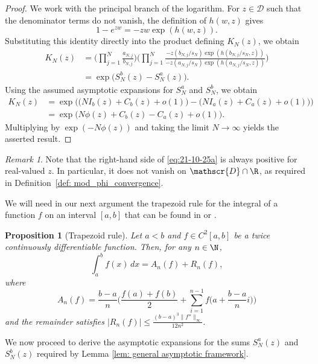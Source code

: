 \documentclass[11pt,a4paper]{scrartcl}
\numberwithin{equation}{section}
\theoremstyle{plain}
\newtheorem{proposition}{Proposition}[section]
\theoremstyle{definition}
\theoremstyle{remark}
\newtheorem{remark}{Remark}[section]
\begin{document}
\begin{proof}
We work with the principal branch of the logarithm. For $z \in \mathscr{D}$ such that the denominator terms do not vanish, the definition of $h(w,z)$ gives
\[
1-e^{zw}=-zw\exp(h(w,z)).
\]
Substituting this identity directly into the product defining $K_N(z)$, we obtain
\begin{align*}
	K_N(z) &= \Big( \prod_{j=1}^N \frac{a_{N,j}}{b_{N,j}} \Big) \Big(\prod_{j=1}^N \frac{-z(b_{N,j}/s_N)\exp(h(b_{N,j}/s_N,z))}{-z(a_{N,j}/s_N)\exp(h(a_{N,j}/s_N,z))}\Big) \\
	&= \exp\Big(S_N^b(z) - S_N^a(z)\Big).
\end{align*}
Using the assumed asymptotic expansions for $S_N^a$ and $S_N^b$, we obtain
\begin{align*}
	K_N(z) &= \exp\Big( \big(N I_b(z) + C_b(z) + o(1)\big) - \big(N I_a(z) + C_a(z) + o(1)\big) \Big) \\
	&= \exp\Big( N\phi(z) + C_b(z) - C_a(z) + o(1) \Big).
\end{align*}
Multiplying by $\exp(-N\phi(z))$ and taking the limit $N\to\infty$ yields the asserted result.
\end{proof}

\begin{remark}
Note that the right-hand side of \eqref{eq:21-10-25a} is always positive for real-valued $z$. In particular, it does not vanish on $\mathscr{D}\cap\R$, as required in Definition~\ref{def: mod_phi_convergence}.
\end{remark}

We will need in our next argument the trapezoid rule for the integral of a function $f$ on an interval $[a,b]$ that can be found in \cite{cerone2019trapezoidal} or \cite[Section 3, Corollary 1]{dragomir1999some}.

\begin{proposition}[Trapezoid rule]\label{prop: trapezoid rule}
	Let $a<b$ and $f\in C^2[a,b]$ be a twice continuously differentiable function. Then, for any $n\in\N$,
	\[
	\int_a^b f(x)\,dx = A_{n}(f) + R_{n}(f),
	\]
	where
	\[
	A_{n}(f) = \frac{b-a}{n}\Big( \frac{f(a)+f(b)}{2} + \sum_{i=1}^{n-1} f\bigl(a + \frac{b-a}{n}i\bigr) \Big)
	\]
	and the remainder satisfies $|R_{n}(f)| \le \frac{(b-a)^3 \|f''\|_{\infty}}{12n^2}$.
\end{proposition}

We now proceed to derive the asymptotic expansions for the sums $S_N^a(z)$ and $S_N^b(z)$ required by Lemma \ref{lem: general asymptotic framework}.
\end{document}

